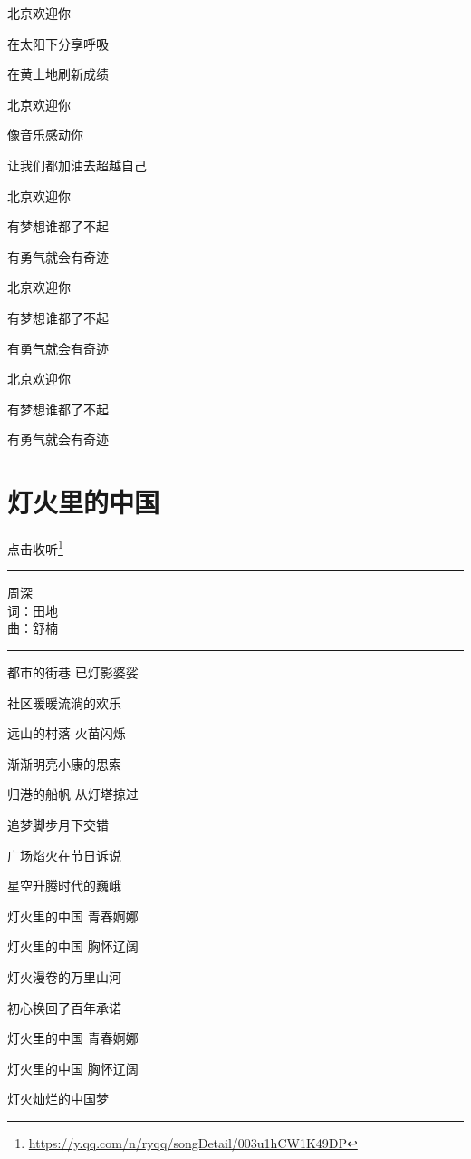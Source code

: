 \documentclass[]{ctexbook}
\renewcommand{\href}[2]{#2\footnote{\url{#1}}}
\begin{document}
北京欢迎你

在太阳下分享呼吸

在黄土地刷新成绩

北京欢迎你

像音乐感动你

让我们都加油去超越自己

北京欢迎你

有梦想谁都了不起

有勇气就会有奇迹

北京欢迎你

有梦想谁都了不起

有勇气就会有奇迹

北京欢迎你

有梦想谁都了不起

有勇气就会有奇迹

\section*{灯火里的中国}\label{China-in-the-lights}


\href{https://y.qq.com/n/ryqq/songDetail/003u1hCW1K49DP}{点击收听}

\begin{center}\rule{0.5\linewidth}{0.5pt}\end{center}

周深\\
词：田地\\
曲：舒楠

\begin{center}\rule{0.5\linewidth}{0.5pt}\end{center}

都市的街巷 已灯影婆娑

社区暖暖流淌的欢乐

远山的村落 火苗闪烁

渐渐明亮小康的思索

归港的船帆 从灯塔掠过

追梦脚步月下交错

广场焰火在节日诉说

星空升腾时代的巍峨

灯火里的中国 青春婀娜

灯火里的中国 胸怀辽阔

灯火漫卷的万里山河

初心换回了百年承诺

灯火里的中国 青春婀娜

灯火里的中国 胸怀辽阔

灯火灿烂的中国梦
\end{document}
